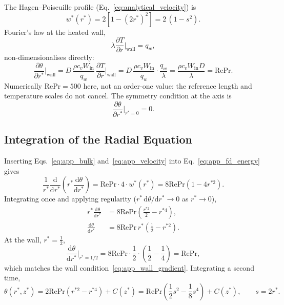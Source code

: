 \documentclass[12pt,a4paper]{article}
\newcommand{\parder}[2]{\frac{\partial #1}{\partial #2}}
\newcommand{\Rey}{\text{Re}}
\newcommand{\Pran}{\text{Pr}}
\begin{document}
The Hagen--Poiseuille profile (Eq.~\eqref{eq:analytical_velocity}) is
\begin{equation}
    w^*(r^*) = 2\left[1-(2r^*)^2\right] = 2\,(1-s^2).
    \label{eq:app_velocity}
\end{equation}
Fourier's law at the heated wall,
\begin{equation}
    \lambda \parder{T}{r}\bigg|_{\text{wall}} = q_w ,
\end{equation}
non-dimensionalises directly:
\begin{equation}
    \parder{\theta}{r^*}\bigg|_{\text{wall}}
    =
    D\,\frac{\rho c_v W_{\text{in}}}{q_w}\,
    \parder{T}{r}\bigg|_{\text{wall}}
    =
    D\,\frac{\rho c_v W_{\text{in}}}{q_w}\cdot\frac{q_w}{\lambda}
    =
    \frac{\rho c_v W_{\text{in}}D}{\lambda}
    =
    \Rey\Pran .
    \label{eq:app_wall_gradient}
\end{equation}
Numerically $\Rey\Pran=500$ here, not an order-one value: the reference length and temperature
scales do not cancel. The symmetry condition at the axis is
\begin{equation}
    \parder{\theta}{r^*}\bigg|_{r^*=0} = 0 .
\end{equation}

\subsection{Integration of the Radial Equation}

Inserting Eqs.~\eqref{eq:app_bulk} and~\eqref{eq:app_velocity} into
Eq.~\eqref{eq:app_fd_energy} gives
\begin{equation}
    \frac{1}{r^*}\frac{\mathrm{d}}{\mathrm{d}r^*}
    \left(r^*\frac{\mathrm{d}\theta}{\mathrm{d}r^*}\right)
    =
    \Rey\Pran\cdot4\cdot w^*(r^*)
    =
    8\Rey\Pran\left(1-4r^{*2}\right).
\end{equation}
Integrating once and applying regularity ($r^*\,\mathrm{d}\theta/\mathrm{d}r^*\to0$ as
$r^*\to0$),
\begin{align}
    r^*\frac{\mathrm{d}\theta}{\mathrm{d}r^*}
    &= 8\Rey\Pran\left(\frac{r^{*2}}{2}-r^{*4}\right),\\
    \frac{\mathrm{d}\theta}{\mathrm{d}r^*}
    &= 8\Rey\Pran\,r^*\left(\frac12-r^{*2}\right).
    \label{eq:app_first_integral}
\end{align}
At the wall, $r^*=\tfrac12$,
\begin{equation}
    \frac{\mathrm{d}\theta}{\mathrm{d}r^*}\bigg|_{r^*=1/2}
    = 8\Rey\Pran\cdot\frac12\cdot\left(\frac12-\frac14\right)
    = \Rey\Pran ,
\end{equation}
which matches the wall condition~\eqref{eq:app_wall_gradient}. Integrating a second time,
\begin{equation}
    \theta(r^*,z^*)
    = 2\Rey\Pran\left(r^{*2}-r^{*4}\right) + C(z^*)
    = \Rey\Pran\left(\frac12 s^2-\frac18 s^4\right) + C(z^*),
    \qquad s=2r^* .
    \label{eq:app_second_integral}
\end{equation}
\end{document}
